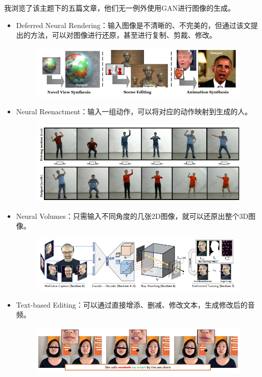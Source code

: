 \documentclass[logo,reportComp]{thesis}
\begin{document}
我浏览了该主题下的五篇文章，他们无一例外使用GAN进行图像的生成。
\begin{itemize}
    \item Deferred Neural Rendering\cite{thies:deferred}：输入图像是不清晰的、不完美的，但通过该文提出的方法，可以对图像进行还原，甚至进行复制、剪裁、修改。
\begin{figure}[H]
\centering
\includegraphics[width=0.8\linewidth]{deferred-neural-rendering.png}
\end{figure}
    \item Neural Reenactment\cite{liu:reenactment}：输入一组动作，可以将对应的动作映射到生成的人。
\begin{figure}[H]
\centering
\includegraphics[width=0.8\linewidth]{neural-rendering-and-reenactment.png}
\end{figure}
    \item Neural Volumes\cite{lombardi:volumes}：只需输入不同角度的几张2D图像，就可以还原出整个3D图像。
\begin{figure}[H]
\centering
\includegraphics[width=0.8\linewidth]{neural-volumes.png}
\end{figure}
    \item Text-based Editing\cite{fried:text}：可以通过直接增添、删减、修改文本，生成修改后的音频。
\begin{figure}[H]
\centering
\includegraphics[width=0.8\linewidth]{text-based.png}

\end{figure}
\end{itemize}
\end{document}
